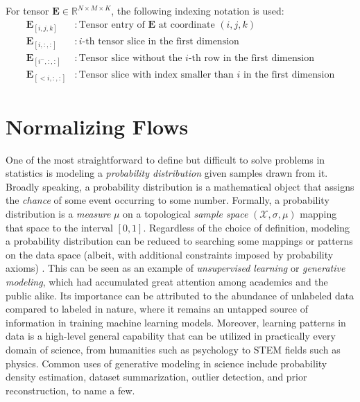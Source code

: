 For tensor $\mathbf{E} \in \mathbb{R}^{N \times M \times K}$, the following
indexing notation is used:
\begin{align*}
  \mathbf{E}_{[i,j,k]} &: \text{Tensor entry of $\mathbf{E}$ at coordinate $(i,j,k)$} \\
  \mathbf{E}_{[i,:,:]} &: \text{$i$-th tensor slice in the first dimension} \\
  \mathbf{E}_{[i^-,:,:]} &: \text{Tensor slice without the $i$-th row in the
  first dimension} \\
  \mathbf{E}_{[<i,:,:]} &: \text{Tensor slice with index
  smaller than $i$ in the first dimension}
\end{align*}

\chapter{Normalizing Flows}
\label{c:nf}

One of the most straightforward to define but difficult to solve problems in
statistics is modeling a \textit{probability distribution} given samples drawn
from it. Broadly speaking, a probability distribution is a mathematical object
that assigns the \textit{chance} of some event occurring to some number. Formally, a
probability distribution is a \textit{measure} $\mu$ on a topological
\textit{sample space} $(\mathcal{X}, \sigma, \mu)$ mapping that space to the
interval $[0,1]$. Regardless of the choice of definition, modeling a probability
distribution can be reduced to searching some mappings or patterns on the data
space (albeit, with additional constraints imposed by probability axioms)
. This can be seen as an example of \textit{unsupervised learning} or
\textit{generative modeling}, which had accumulated great attention among
academics and the public alike. Its importance can be attributed to the
abundance of unlabeled data compared to labeled in nature, where it remains an
untapped source of information in training machine learning models. Moreover,
learning patterns in data is a high-level general capability that can be
utilized in practically every domain of science, from humanities such as
psychology to STEM fields such as physics. Common uses of generative
modeling in science include probability density estimation, dataset
summarization, outlier detection, and prior reconstruction, to name a few.

